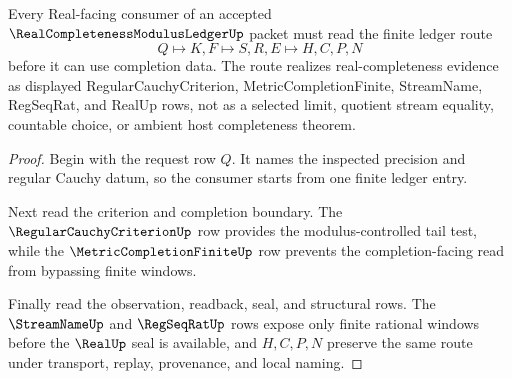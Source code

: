 \begin{theorem}
\label{thm:real-completeness-modulus-ledger-finite-route}
Every Real-facing consumer of an accepted $\RealCompletenessModulusLedgerUp$ packet must read the finite ledger route
$$
Q \longmapsto K,F \longmapsto S,R,E \longmapsto H,C,P,N
$$
before it can use completion data. The route realizes real-completeness evidence as displayed RegularCauchyCriterion, MetricCompletionFinite, StreamName, RegSeqRat, and RealUp rows, not as a selected limit, quotient stream equality, countable choice, or ambient host completeness theorem.
\end{theorem}
\begin{proof}
Begin with the request row $Q$. It names the inspected precision and regular Cauchy datum, so the consumer starts from one finite ledger entry.

Next read the criterion and completion boundary. The $\RegularCauchyCriterionUp$ row provides the modulus-controlled tail test, while the $\MetricCompletionFiniteUp$ row prevents the completion-facing read from bypassing finite windows.

Finally read the observation, readback, seal, and structural rows. The $\StreamNameUp$ and $\RegSeqRatUp$ rows expose only finite rational windows before the $\RealUp$ seal is available, and $H,C,P,N$ preserve the same route under transport, replay, provenance, and local naming.
\end{proof}




